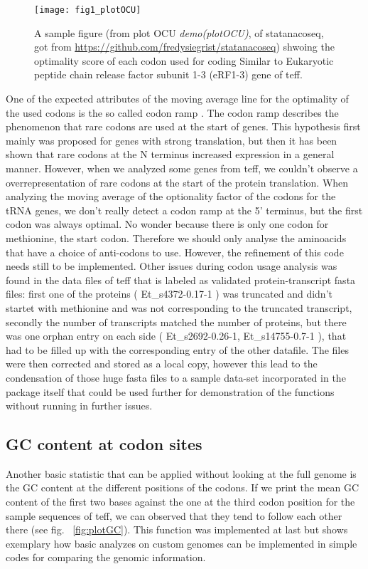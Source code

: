 \begin{figure}[tb] 
\centering 
\texttt{[image: fig1\_plotOCU]} 
\caption[A sample figure from demo plotOCU]{A sample figure (from plot OCU \emph{demo(plotOCU)}, of statanacoseq, got from \url{https://github.com/fredysiegrist/statanacoseq}) shwoing the optimality score of each codon used for coding Similar to Eukaryotic peptide chain release factor subunit 1-3 (eRF1-3) gene of teff.}
\label{fig:plotOCU} 
\end{figure}

One of the expected attributes of the moving average line for the optimality of the used codons is the so called codon ramp \cite{Tuller2010}. The codon ramp describes the phenomenon that rare codons are used at the start of genes. This hypothesis first mainly was proposed for genes with strong translation, but then it has been shown that rare codons at the N terminus increased expression in a general manner. However, when we analyzed some genes from teff, we couldn't observe a overrepresentation of rare codons at the start of the protein translation.  When analyzing the moving average of the optionality factor of the codons for the tRNA genes, we don't really detect a codon ramp at the 5' terminus, but the first codon was always optimal. No wonder because there is only one codon for methionine, the start codon. Therefore we should only analyse the aminoacids that have a choice of anti-codons to use. However, the refinement of this code needs still to be implemented.  
Other issues during codon usage analysis was found in the data files of teff that is labeled as validated protein-transcript fasta files: 
first one of the proteins (
Et\_s4372-0.17-1
) was truncated and didn't startet with methionine and was not corresponding to the truncated transcript, secondly the number of transcripts matched the number of proteins, but there was one orphan entry on each side (
Et\_s2692-0.26-1, Et\_s14755-0.7-1
), that had to be filled up with the corresponding entry of the other datafile. 
The files were then corrected and stored as a local copy, however this lead to the condensation of those huge fasta files to a sample data-set incorporated in the package itself that could be used further for demonstration of the functions without running in further issues.

\subsection{GC content at codon sites}
Another basic statistic that can be applied without looking at the full genome is the GC content at the different positions of the codons. If we print the mean GC content of the first two bases against the one at the third codon position for the sample sequences of teff, we can observed that they tend to follow each other there (see fig. ~\ref{fig:plotGC}). This function was implemented at last but shows exemplary how basic analyzes on custom genomes can be implemented in simple codes for comparing the genomic information.

